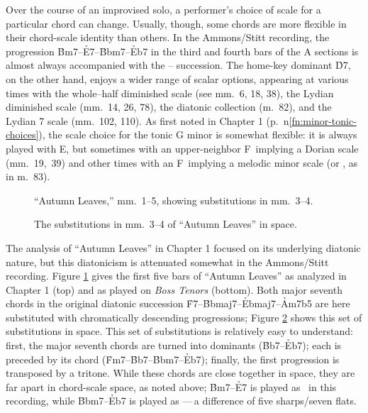 Over the course of an improvised solo, a performer's choice of scale for a
particular chord can change. Usually, though, some chords are more flexible in
their chord-scale identity than others. In the Ammons/Stitt
recording, the progression \h{Bm7}--\h{E7}--\h{Bbm7}--\h{Eb7} in the third and
fourth bars of the A sections is almost always accompanied with the
-- succession. The
home-key dominant \h{D7}, on the other hand, enjoys a wider range of scalar
options, appearing at various times with the whole--half diminished scale (see
mm.~6, 18, 38), the Lydian diminished scale (mm.~14, 26, 78), the diatonic
collection (m.~82), and the Lydian \flat{}7 scale (mm.~102, 110). As first
noted in Chapter 1
(p.~\pageref{fn:minor-tonic-choices}n\ref{fn:minor-tonic-choices}), the scale
choice for the tonic G minor is somewhat flexible: it is always played with
E\nat, but sometimes with an upper-neighbor F\nat\ implying a Dorian scale
(mm.~19,~39) and other times with an F\sharp\ implying a melodic minor scale
(or , as in m.~83).

\begin{figure}[tbp]
  \caption{``Autumn Leaves,'' mm.~1--5, showing substitutions in mm.~3--4.}
  \label{csa:al-subs}
\end{figure}

\begin{figure}[tbp]
  \caption{The substitutions in mm.~3--4 of ``Autumn Leaves'' in \tf space.}
  \label{csa:al-subs-space}
\end{figure}

The analysis of ``Autumn Leaves'' in Chapter 1 focused on its underlying
diatonic nature, but this diatonicism is attenuated somewhat in the
Ammons/Stitt recording. Figure \ref{csa:al-subs} gives the first five bars of
``Autumn Leaves'' as analyzed in Chapter 1 (top) and as played on \emph{Boss
  Tenors} (bottom). Both major seventh chords in the original diatonic
succession \h{F7}--\h{Bbmaj7}--\h{Ebmaj7}--\h{Am7b5} are here substituted with
chromatically descending \tf progressions; Figure \ref{csa:al-subs-space}
shows this set of substitutions in \tf space. This set of substitutions is
relatively easy to understand: first, the major seventh chords are turned into
dominants (\h{Bb7}--\h{Eb7}); each is preceded by its \ii chord
(\h{Fm7}--\h{Bb7}--\h{Bbm7}--\h{Eb7}); finally, the first \tf progression is
transposed by a tritone. While these chords are close together in \tf space,
they are far apart in chord-scale space, as noted above; \h{Bm7}--\h{E7}
is played as \ in this recording, while
\h{Bbm7}--\h{Eb7} is played as ---\,a difference of
five sharps/seven flats.

